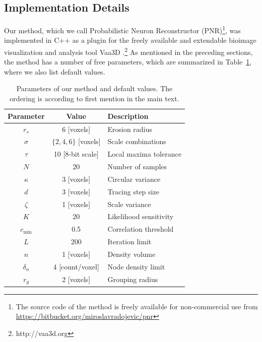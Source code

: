 \subsection{Implementation Details}
\label{subsec:implementation}
Our method, which we call Probabilistic Neuron Reconstructor (PNR)\footnote{The source code of the method is freely available for non-commercial use from \url{https://bitbucket.org/miroslavradojevic/pnr}}, was implemented in C++ as a plugin for the freely available and extendable bioimage visualization and analysis tool Vaa3D \cite{peng2010v3d, peng2014extensible}.\footnote{http://vaa3d.org} As mentioned in the preceding sections, the method has a number of free parameters, which are summarized in Table~\ref{tab:params}, where we also list default values.
\begin{table}
	\small\centering
	\begin{tabular}{@{}c@{\hspace{1em}}c@{\hspace{2em}}l@{}}
		\hline
		Parameter & Value & Description \\
		\hline
		$r_s$ & 6 [voxels] & Erosion radius \\
		$\sigma$ & $\{ 2,4,6 \}$ [voxels]  & Scale combinations \\ %
		$\tau$ & 10 [8-bit scale] & Local maxima tolerance \\ %
		$N$ & 20 & Number of samples \\
		$\kappa$ & 3 [voxels] & Circular variance \\
		$d$ & 3 [voxels] & Tracing step size \\
		$\zeta$ & 1 [voxels] & Scale variance \\
		$K$ & 20 & Likelihood sensitivity \\
		$c_{\text{min}}$ & 0.5 & Correlation threshold \\ %
		$L$ & 200 & Iteration limit \\
		$n$ & 1 [voxels] & Density volume \\
		$\delta_n$ & 4 [count/voxel] & Node density limit \\
		$r_g$ & 2 [voxels] & Grouping radius \\
		\hline
	\end{tabular}
	\caption{Parameters of our method and default values. The ordering is according to first mention in the main text.}
	\label{tab:params}
\end{table}

